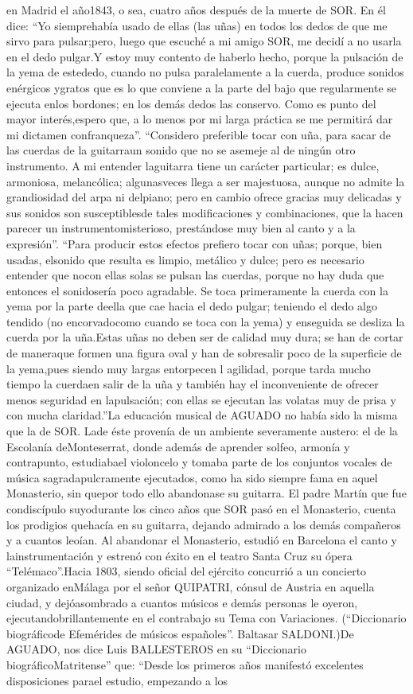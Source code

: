\documentclass[
10pt, %
a4paper, %
oneside, %
headinclude,footinclude, %
BCOR5mm, %
]{scrartcl}
\begin{document}
{en Madrid el año1843, o sea, cuatro años después de la muerte de SOR. En él dice: “Yo siemprehabía usado de ellas (las uñas) en todos los dedos de que me sirvo para pulsar;pero, luego que escuché a mi amigo SOR, me decidí a no usarla en el dedo pulgar.Y estoy muy contento de haberlo hecho, porque la pulsación de la yema de estededo, cuando no pulsa paralelamente a la cuerda, produce sonidos enérgicos ygratos que es lo que conviene a la parte del bajo que regularmente se ejecuta enlos bordones; en los demás dedos las conservo. Como es punto del mayor interés,espero que, a lo menos por mi larga práctica se me permitirá dar mi dictamen confranqueza”. “Considero preferible tocar con uña, para sacar de las cuerdas de la guitarraun sonido que no se asemeje al de ningún otro instrumento. A mi entender laguitarra tiene un carácter particular; es dulce, armoniosa, melancólica; algunasveces llega a ser majestuosa, aunque no admite la grandiosidad del arpa ni delpiano; pero en cambio ofrece gracias muy delicadas y sus sonidos son susceptiblesde tales modificaciones y combinaciones, que la hacen parecer un instrumentomisterioso, prestándose muy bien al canto y a la expresión”. “Para producir estos efectos prefiero tocar con uñas; porque, bien usadas, elsonido que resulta es limpio, metálico y dulce; pero es necesario entender que nocon ellas solas se pulsan las cuerdas, porque no hay duda que entonces el sonidosería poco agradable. Se toca primeramente la cuerda con la yema por la parte deella que cae hacia el dedo pulgar; teniendo el dedo algo tendido (no encorvadocomo cuando se toca con la yema) y enseguida se desliza la cuerda por la uña.Estas uñas no deben ser de calidad muy dura; se han de cortar de maneraque formen una figura oval y han de sobresalir poco de la superficie de la yema,pues siendo muy largas entorpecen l agilidad, porque tarda mucho tiempo la cuerdaen salir de la uña y también hay el inconveniente de ofrecer menos seguridad en lapulsación; con ellas se ejecutan las volatas muy de prisa y con mucha claridad.”La educación musical de AGUADO no había sido la misma que la de SOR. Lade éste provenía de un ambiente severamente austero: el de la Escolanía deMonteserrat, donde además de aprender solfeo, armonía y contrapunto, estudiabael violoncelo y tomaba parte de los conjuntos vocales de música sagradapulcramente ejecutados, como ha sido siempre fama en aquel Monasterio, sin quepor todo ello abandonase su guitarra. El padre Martín que fue condiscípulo suyodurante los cinco años que SOR pasó en el Monasterio, cuenta los prodigios quehacía en su guitarra, dejando admirado a los demás compañeros y a cuantos leoían. Al abandonar el Monasterio, estudió en Barcelona el canto y lainstrumentación y estrenó con éxito en el teatro Santa Cruz su ópera “Telémaco”.Hacia 1803, siendo oficial del ejército concurrió a un concierto organizado enMálaga por el señor QUIPATRI, cónsul de Austria en aquella ciudad, y dejóasombrado a cuantos músicos e demás personas le oyeron, ejecutandobrillantemente en el contrabajo su Tema con Variaciones. (“Diccionario biográficode Efemérides de músicos españoles”. Baltasar SALDONI.)De AGUADO, nos dice Luis BALLESTEROS en su “Diccionario biográficoMatritense” que: “Desde los primeros años manifestó excelentes disposiciones parael estudio, empezando a los }
\end{document}

